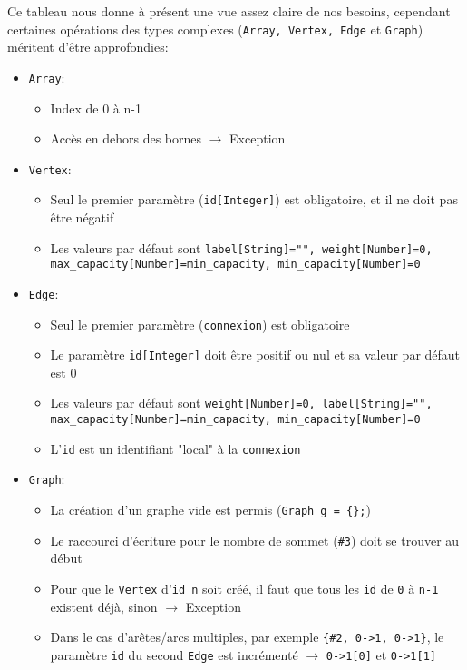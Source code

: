 \documentclass[french]{article}
\begin{document}
			Ce tableau nous donne à présent une vue assez claire de nos besoins, cependant certaines opérations des types complexes (\texttt{Array, Vertex, Edge} et \texttt{Graph}) méritent d'être approfondies:
			
				\begin{itemize}
					\item \texttt{Array}: 
					\begin{itemize}
						\item Index de 0 à n-1
						\item Accès en dehors des bornes $\rightarrow$ Exception
					\end{itemize}
					\item \texttt{Vertex}:
					\begin{itemize}
						\item Seul le premier paramètre (\texttt{id[Integer]}) est obligatoire, et il ne doit pas être négatif
						\item Les valeurs par défaut sont \texttt{label[String]="", weight[Number]=0, max\_capacity[Number]=min\_capacity, min\_capacity[Number]=0}
					\end{itemize}
					\item \texttt{Edge}: 
					\begin{itemize}
						\item Seul le premier paramètre (\texttt{connexion}) est obligatoire
						\item Le paramètre \texttt{id[Integer]} doit être positif ou nul et sa valeur par défaut est 0
						\item Les valeurs par défaut sont \texttt{weight[Number]=0, label[String]="", max\_capacity[Number]=min\_capacity, min\_capacity[Number]=0}
						\item L'\texttt{id} est un identifiant "local" à la \texttt{connexion}
					\end{itemize}
					\item \texttt{Graph}: 
					\begin{itemize}
						\item La création d'un graphe vide est permis (\texttt{Graph g = \{\};})
						\item Le raccourci d'écriture pour le nombre de sommet (\texttt{\#3}) doit se trouver au début
						\item Pour que le \texttt{Vertex} d'\texttt{id n} soit créé, il faut que tous les \texttt{id} de \texttt{0} à \texttt{n-1} existent déjà, sinon $\rightarrow$ Exception 
						\item Dans le cas d'arêtes/arcs multiples, par exemple \texttt{\{\#2, 0->1, 0->1\}}, le paramètre \texttt{id} du second \texttt{Edge} est incrémenté $\rightarrow$ \texttt{0->1[0]} et \texttt{0->1[1]}

\end{itemize}
\end{itemize}
\end{document}
